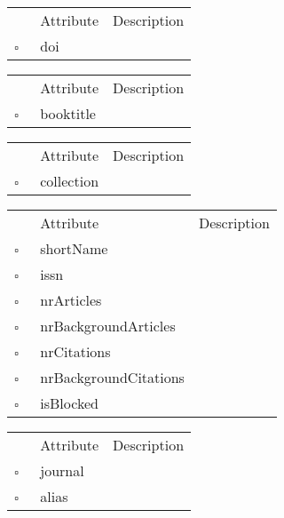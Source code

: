 \clearpage
\begin{table}
\caption{DoiReference  }

\begin{longtable}{llp{8cm}}
& Attribute & Description \\
$\square$\ & doi &  \\
\end{longtable}
\label{attr:DoiReference}
\end{table}

\begin{table}
\caption{InBook  }

\begin{longtable}{llp{8cm}}
& Attribute & Description \\
$\square$\ & booktitle &  \\
\end{longtable}
\label{attr:InBook}
\end{table}

\begin{table}
\caption{InCollection  }

\begin{longtable}{llp{8cm}}
& Attribute & Description \\
$\square$\ & collection &  \\
\end{longtable}
\label{attr:InCollection}
\end{table}

\begin{table}
\caption{Journal  }

\begin{longtable}{llp{8cm}}
& Attribute & Description \\
$\square$\ & shortName &  \\
$\square$\ & issn &  \\
$\square$\ & nrArticles &  \\
$\square$\ & nrBackgroundArticles &  \\
$\square$\ & nrCitations &  \\
$\square$\ & nrBackgroundCitations &  \\
$\square$\ & isBlocked &  \\
\end{longtable}
\label{attr:Journal}
\end{table}

\begin{table}
\caption{JournalAlias  }

\begin{longtable}{llp{8cm}}
& Attribute & Description \\
$\square$\ & journal &  \\
$\square$\ & alias &  \\
\end{longtable}
\label{attr:JournalAlias}
\end{table}

